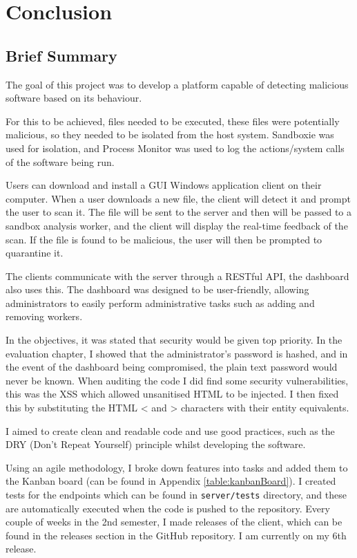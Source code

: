 \chapter{Conclusion}

\section{Brief Summary}
The goal of this project was to develop a platform capable
of detecting malicious software based on its behaviour.

For this to be achieved, files needed to be executed,
these files were potentially malicious,
so they needed to be isolated from the host system.
Sandboxie was used for isolation,
and Process Monitor was used to log
the actions/system calls of the software being run.

Users can download and install a GUI Windows application client on their computer.
When a user downloads a new file, the client will detect it and prompt the user to scan it.
The file will be sent to the server and then will be passed to a sandbox analysis worker,
and the client will display the real-time feedback of the scan.
If the file is found to be malicious, the user will then be prompted to quarantine it.

The clients communicate with the server through a RESTful API,
the dashboard also uses this.
The dashboard was designed to be user-friendly,
allowing administrators to easily perform administrative tasks
such as adding and removing workers.

In the objectives, it was stated that security would be given top priority.
In the evaluation chapter, I showed that the administrator's password is hashed,
and in the event of the dashboard being compromised,
the plain text password would never be known.
When auditing the code I did find some security vulnerabilities,
this was the XSS which allowed unsanitised HTML to be injected.
I then fixed this by substituting the HTML < and >
characters with their entity equivalents.

I aimed to create clean and readable code and use good practices,
such as the DRY (Don't Repeat Yourself) principle whilst developing the software.

Using an agile methodology,
I broke down features into tasks and added them to the Kanban board
(can be found in Appendix \ref{table:kanbanBoard}).
I created tests for the endpoints which can be found in \texttt{server/tests} directory,
and these are automatically executed when the code is pushed to the repository.
Every couple of weeks in the 2nd semester, I made releases of the client,
which can be found in the releases section in the GitHub repository.
I am currently on my 6th release.

